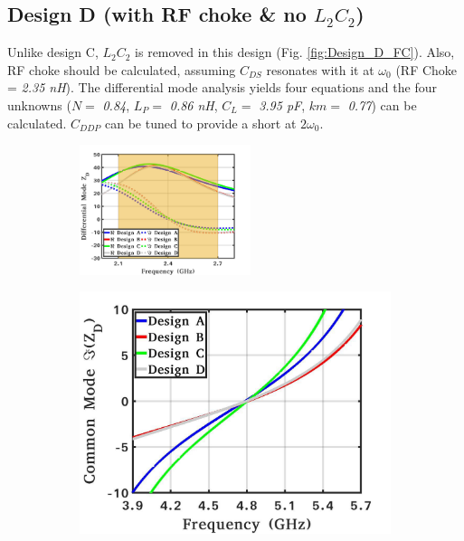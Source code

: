 \documentclass[conference]{IEEEtran}
\begin{document}
\subsection{Design D (with RF choke \& no $L_2C_2$)}
 Unlike design C, $L_2C_2$ is removed in this design (Fig. \ref{fig:Design_D_FC}). Also, RF choke should be calculated, assuming $C_{DS}$ resonates with it at $\omega_0$ (RF Choke = \textit{2.35 nH}).
The differential mode analysis yields four equations and the four unknowns ($N =$ \textit{0.84}, $L_P =$ \textit{0.86 nH}, $C_L =$ \textit{3.95 pF}, $km =$ \textit{0.77}) can be calculated.
$C_{DDP}$ can be tuned to provide a short at $2\omega_0$.

\begin{figure}[!t]
	\captionsetup{font=footnotesize}
	\centering
	\begin{subfigure}{0.5\textwidth}
		\centering
		\includegraphics[width=0.55\textwidth]{Images/Output_Network_Comp/Comp_1H.pdf}
		\caption{}
		\label{fig:Comp_1H}
	\end{subfigure}
	\begin{subfigure}{0.24\textwidth}
		\includegraphics[width=1\textwidth]{Images/Output_Network_Comp/Comp_2H_imag.pdf}

\end{subfigure}
\end{figure}
\end{document}
